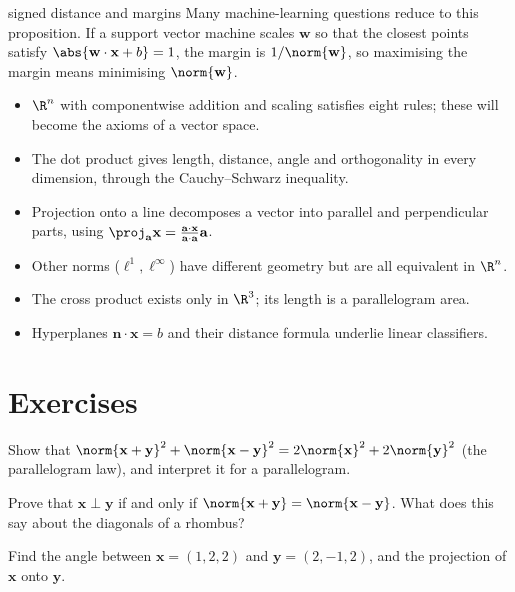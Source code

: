 \begin{interview}{signed distance and margins}
Many machine-learning questions reduce to this proposition. If a support vector machine scales $\mathbf{w}$ so that the closest points satisfy $\abs{\mathbf{w}\cdot\mathbf{x}+b}=1$, the margin is $1/\norm{\mathbf{w}}$, so maximising the margin means minimising $\norm{\mathbf{w}}$.
\end{interview}

\begin{summarybox}
\begin{itemize}
  \item $\R^n$ with componentwise addition and scaling satisfies eight rules; these will become the axioms of a vector space.
  \item The dot product gives length, distance, angle and orthogonality in every dimension, through the Cauchy--Schwarz inequality.
  \item Projection onto a line decomposes a vector into parallel and perpendicular parts, using $\proj_{\mathbf{a}}\mathbf{x}=\frac{\mathbf{a}\cdot\mathbf{x}}{\mathbf{a}\cdot\mathbf{a}}\mathbf{a}$.
  \item Other norms ($\ell^1,\ell^\infty$) have different geometry but are all equivalent in $\R^n$.
  \item The cross product exists only in $\R^3$; its length is a parallelogram area.
  \item Hyperplanes $\mathbf{n}\cdot\mathbf{x}=b$ and their distance formula underlie linear classifiers.
\end{itemize}
\end{summarybox}

\section{Exercises}

\begin{exercise}
Show that $\norm{\mathbf{x}+\mathbf{y}}^2+\norm{\mathbf{x}-\mathbf{y}}^2=2\norm{\mathbf{x}}^2+2\norm{\mathbf{y}}^2$ (the parallelogram law), and interpret it for a parallelogram.
\end{exercise}

\begin{exercise}
Prove that $\mathbf{x}\perp\mathbf{y}$ if and only if $\norm{\mathbf{x}+\mathbf{y}}=\norm{\mathbf{x}-\mathbf{y}}$. What does this say about the diagonals of a rhombus?
\end{exercise}

\begin{exercise}
Find the angle between $\mathbf{x}=(1,2,2)$ and $\mathbf{y}=(2,-1,2)$, and the projection of $\mathbf{x}$ onto $\mathbf{y}$.
\end{exercise}

